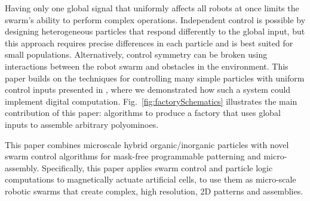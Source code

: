 Having only one global signal that uniformly affects all robots at once
limits the swarm's ability to perform complex operations.
Independent control is possible by designing heterogeneous particles that respond differently to the global input, but this approach requires precise differences in each particle and is best suited for small populations. 
Alternatively, control symmetry can be broken using interactions between the robot swarm and obstacles in the environment. 
This paper builds on the techniques for controlling many simple particles with uniform control inputs presented in \cite{Becker2013f,Becker2014,Becker2014a}, where
we demonstrated how such a system could  implement digital computation.
Fig.~\ref{fig:factorySchematics} illustrates the main contribution of this paper: algorithms to produce a factory that uses global inputs to assemble arbitrary polyominoes.

This paper combines microscale hybrid organic/inorganic particles with novel swarm control algorithms for mask-free programmable patterning and micro-assembly. 
Specifically, this paper applies swarm control and particle logic computations to magnetically actuate artificial cells, to use them as micro-scale robotic swarms that create complex, high resolution, 2D patterns and assemblies.

